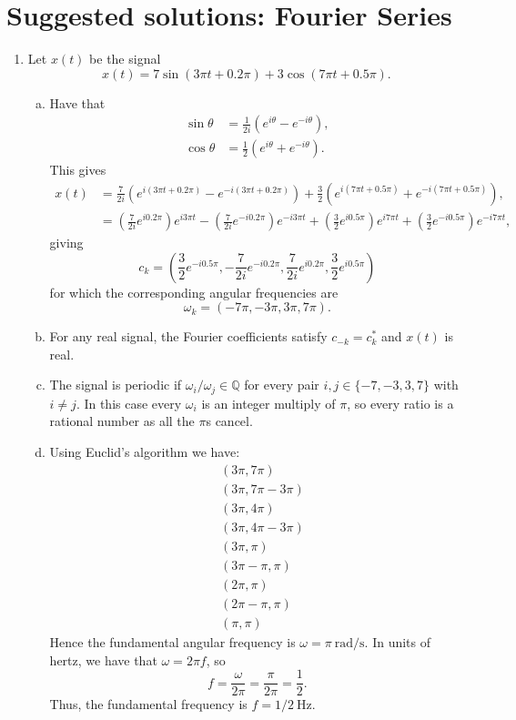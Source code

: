 \newpage
\section{Suggested solutions: Fourier Series}

\begin{enumerate}
\item Let $x(t)$ be the signal 
$$x(t)=7\sin(3\pi t+0.2\pi)+3\cos(7\pi t+0.5\pi).$$

\begin{enumerate}[a)]
\item Have that
\begin{align*}
    \sin\theta&=\frac{1}{2i}(e^{i\theta}-e^{-i\theta}), \\
    \cos\theta&=\frac{1}{2}(e^{i\theta}+e^{-i\theta}).
\end{align*}
This gives
\begin{align*}
    x(t)&=\frac{7}{2i}(e^{i(3\pi t+0.2\pi)}-e^{-i(3\pi t+0.2\pi)})+ \frac{3}{2}(e^{i(7\pi t+0.5\pi)}+e^{-i(7\pi t+0.5\pi)}), \\
    &=\left(\frac{7}{2i}e^{i0.2\pi}\right)e^{i3\pi t}-\left(\frac{7}{2i}e^{-i0.2\pi}\right)e^{-i3\pi t} + \left(\frac{3}{2}e^{i0.5\pi}\right)e^{i7\pi t}+\left(\frac{3}{2}e^{-i0.5\pi}\right)e^{-i7\pi t},
\end{align*}
giving
$$c_{k}=\left(\frac{3}{2}e^{-i0.5\pi},-\frac{7}{2i}e^{-i0.2\pi},\frac{7}{2i}e^{i0.2\pi},\frac{3}{2}e^{i0.5\pi}\right)$$
for which the corresponding angular frequencies are
$$\omega_{k}=(-7\pi,-3\pi,3\pi,7\pi).$$

\item For any real signal, the Fourier coefficients satisfy $c_{-k}=c_{k}^{*}$ and $x(t)$ is real. 

\item The signal is periodic if $\omega_{i}/\omega_{j}\in\mathbb{Q}$ for every pair $i,j\in \{-7,-3,3,7\}$ with $i\neq j$. In this case every $\omega_{i}$ is an integer multiply of $\pi$, so every ratio is a rational number as all the $\pi$s cancel.

\item Using Euclid's algorithm we have:
\begin{align*}
    &(3\pi,7\pi) \\
    &(3\pi,7\pi-3\pi) \\
    &(3\pi,4\pi) \\
    &(3\pi,4\pi-3\pi) \\
    &(3\pi,\pi) \\
    &(3\pi-\pi,\pi) \\
    &(2\pi,\pi) \\
    &(2\pi-\pi,\pi) \\
    &(\pi,\pi)
\end{align*}
Hence the fundamental angular frequency is $\omega=\pi\ \text{rad/s}$. In units of hertz, we have that $\omega=2\pi f$, so
$$f=\frac{\omega}{2\pi}=\frac{\pi}{2\pi}=\frac{1}{2}.$$
Thus, the fundamental frequency is $f=1/2\ \text{Hz}$. 


\end{enumerate}
\end{enumerate}
